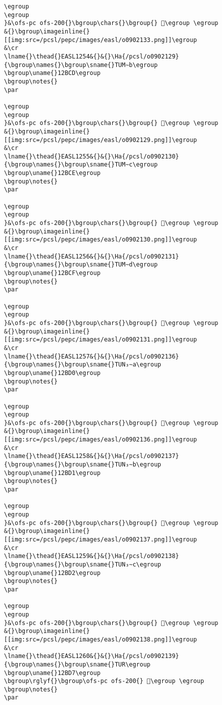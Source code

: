 \begin{verbatim}
\egroup
\egroup
}&\ofs-pc ofs-200{}\bgroup\chars{}\bgroup{} 𒯌\egroup \egroup
&{}\bgroup\imageinline{}[[img:src=/pcsl/pepc/images/easl/o0902133.png]]\egroup
&\cr
\lname{}\thead{}EASL1254&{}&{}\Ha{/pcsl/o0902129}{\bgroup\names{}\bgroup\sname{}TUM∼b\egroup
\bgroup\uname{}12BCD\egroup
\bgroup\notes{}
\par 

\egroup
\egroup
}&\ofs-pc ofs-200{}\bgroup\chars{}\bgroup{} 𒯍\egroup \egroup
&{}\bgroup\imageinline{}[[img:src=/pcsl/pepc/images/easl/o0902129.png]]\egroup
&\cr
\lname{}\thead{}EASL1255&{}&{}\Ha{/pcsl/o0902130}{\bgroup\names{}\bgroup\sname{}TUM∼c\egroup
\bgroup\uname{}12BCE\egroup
\bgroup\notes{}
\par 

\egroup
\egroup
}&\ofs-pc ofs-200{}\bgroup\chars{}\bgroup{} 𒯎\egroup \egroup
&{}\bgroup\imageinline{}[[img:src=/pcsl/pepc/images/easl/o0902130.png]]\egroup
&\cr
\lname{}\thead{}EASL1256&{}&{}\Ha{/pcsl/o0902131}{\bgroup\names{}\bgroup\sname{}TUM∼d\egroup
\bgroup\uname{}12BCF\egroup
\bgroup\notes{}
\par 

\egroup
\egroup
}&\ofs-pc ofs-200{}\bgroup\chars{}\bgroup{} 𒯏\egroup \egroup
&{}\bgroup\imageinline{}[[img:src=/pcsl/pepc/images/easl/o0902131.png]]\egroup
&\cr
\lname{}\thead{}EASL1257&{}&{}\Ha{/pcsl/o0902136}{\bgroup\names{}\bgroup\sname{}TUN₃∼a\egroup
\bgroup\uname{}12BD0\egroup
\bgroup\notes{}
\par 

\egroup
\egroup
}&\ofs-pc ofs-200{}\bgroup\chars{}\bgroup{} 𒯐\egroup \egroup
&{}\bgroup\imageinline{}[[img:src=/pcsl/pepc/images/easl/o0902136.png]]\egroup
&\cr
\lname{}\thead{}EASL1258&{}&{}\Ha{/pcsl/o0902137}{\bgroup\names{}\bgroup\sname{}TUN₃∼b\egroup
\bgroup\uname{}12BD1\egroup
\bgroup\notes{}
\par 

\egroup
\egroup
}&\ofs-pc ofs-200{}\bgroup\chars{}\bgroup{} 𒯑\egroup \egroup
&{}\bgroup\imageinline{}[[img:src=/pcsl/pepc/images/easl/o0902137.png]]\egroup
&\cr
\lname{}\thead{}EASL1259&{}&{}\Ha{/pcsl/o0902138}{\bgroup\names{}\bgroup\sname{}TUN₃∼c\egroup
\bgroup\uname{}12BD2\egroup
\bgroup\notes{}
\par 

\egroup
\egroup
}&\ofs-pc ofs-200{}\bgroup\chars{}\bgroup{} 𒯒\egroup \egroup
&{}\bgroup\imageinline{}[[img:src=/pcsl/pepc/images/easl/o0902138.png]]\egroup
&\cr
\lname{}\thead{}EASL1260&{}&{}\Ha{/pcsl/o0902139}{\bgroup\names{}\bgroup\sname{}TUR\egroup
\bgroup\uname{}12BD7\egroup
\bgroup\rglyf{}\bgroup\ofs-pc ofs-200{} 𒯗\egroup \egroup
\bgroup\notes{}
\par 


\end{verbatim}
